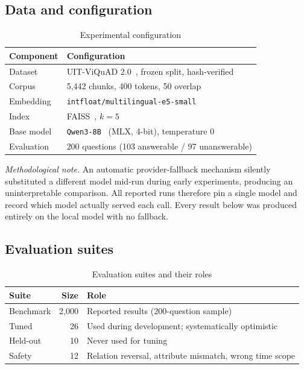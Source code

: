 \documentclass[conference]{IEEEtran}
\begin{document}
\subsection{Data and configuration}

\begin{table}[t]
\caption{Experimental configuration}
\label{tab:setup}
\centering
\footnotesize
\begin{tabular}{@{}ll@{}}
\toprule
Component & Configuration \\
\midrule
Dataset       & UIT-ViQuAD 2.0~\cite{viquad}, frozen split, hash-verified \\
Corpus        & 5{,}442 chunks, 400 tokens, 50 overlap \\
Embedding     & \texttt{intfloat/multilingual-e5-small}~\cite{e5} \\
Index         & FAISS~\cite{faiss}, $k = 5$ \\
Base model    & \texttt{Qwen3-8B}~\cite{qwen} (MLX, 4-bit), temperature 0 \\
Evaluation    & 200 questions (103 answerable / 97 unanswerable) \\
\bottomrule
\end{tabular}
\end{table}

\emph{Methodological note.} An automatic provider-fallback mechanism silently
substituted a different model mid-run during early experiments, producing an
uninterpretable comparison. All reported runs therefore pin a single model and
record which model actually served each call. Every result below was produced
entirely on the local model with no fallback.

\subsection{Evaluation suites}
\label{sec:eval-sets}

\begin{table}[t]
\caption{Evaluation suites and their roles}
\label{tab:sets}
\centering
\footnotesize
\begin{tabular}{@{}lrp{4.0cm}@{}}
\toprule
Suite & Size & Role \\
\midrule
Benchmark & 2{,}000 & Reported results (200-question sample) \\
Tuned     & 26 & Used during development; systematically optimistic \\
Held-out  & 10 & Never used for tuning \\
Safety    & 12 & Relation reversal, attribute mismatch, wrong time scope \\
\bottomrule
\end{tabular}
\end{table}
\end{document}
